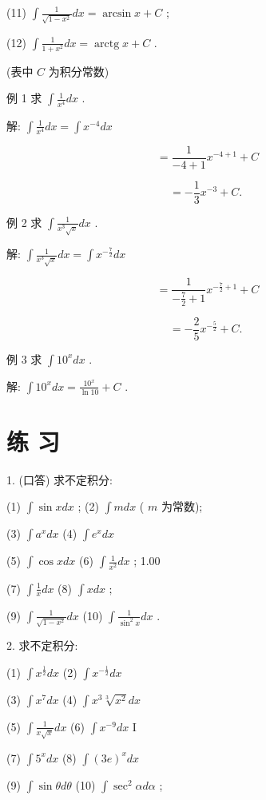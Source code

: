 \documentclass[10pt]{article}
\begin{document}
(11) \(\int \frac{1}{\sqrt{1 - {x}^{2}}}{dx} = \arcsin x + C\) ;

(12) \(\int \frac{1}{1 + {x}^{2}}{dx} = \operatorname{arctg}x + C\) .

(表中 \(C\) 为积分常数)

例 1 求 \(\int \frac{1}{{x}^{4}}{dx}\) .

解: \(\int \frac{1}{{x}^{4}}{dx} = \int {x}^{-4}{dx}\)

\[
= \frac{1}{-4 + 1}{x}^{-4 + 1} + C
\]

\[
= - \frac{1}{3}{x}^{-3} + C\text{. }
\]

例 2 求 \(\int \frac{1}{{x}^{3}\sqrt{x}}{dx}\) .

解: \(\int \frac{1}{{x}^{3}\sqrt{x}}{dx} = \int {x}^{-\frac{7}{2}}{dx}\)

\[
= \frac{1}{-\frac{7}{2} + 1}{x}^{-\frac{7}{2} + 1} + C
\]

\[
= - \frac{2}{5}{x}^{-\frac{5}{2}} + C\text{. }
\]

例 3 求 \(\int {10}^{x}{dx}\) .

解: \(\int {10}^{x}{dx} = \frac{{10}^{x}}{\ln {10}} + C\) .

\section*{练 习}

1. (口答) 求不定积分:

(1) \(\int \sin {xdx}\) ; (2) \(\int {mdx}\) ( \(m\) 为常数);

(3) \(\int {a}^{x}{dx}\) (4) \(\int {e}^{x}{dx}\)

(5) \(\int \cos {xdx}\) (6) \(\int \frac{1}{{x}^{2}}{dx}\) ; 1.00

(7) \(\int \frac{1}{x}{dx}\) (8) \(\int {xdx}\) ;

(9) \(\int \frac{1}{\sqrt{1 - {x}^{2}}}{dx}\) (10) \(\int \frac{1}{{\sin }^{2}x}{dx}\) .

2. 求不定积分:

(1) \(\int {x}^{\frac{1}{2}}{dx}\) (2) \(\int {x}^{-\frac{1}{2}}{dx}\)

(3) \(\int {x}^{7}{dx}\) (4) \(\int {x}^{3}\sqrt[3]{{x}^{2}}{dx}\)

(5) \(\int \frac{1}{x\sqrt{x}}{dx}\) (6) \(\int {x}^{-9}{dx}\) I

(7) \(\int {5}^{x}{dx}\) (8) \(\int {\left( 3e\right) }^{x}{dx}\)

(9) \(\int \sin {\theta d\theta }\) (10) \(\int {\sec }^{2}{\alpha d\alpha }\) ;
\end{document}

